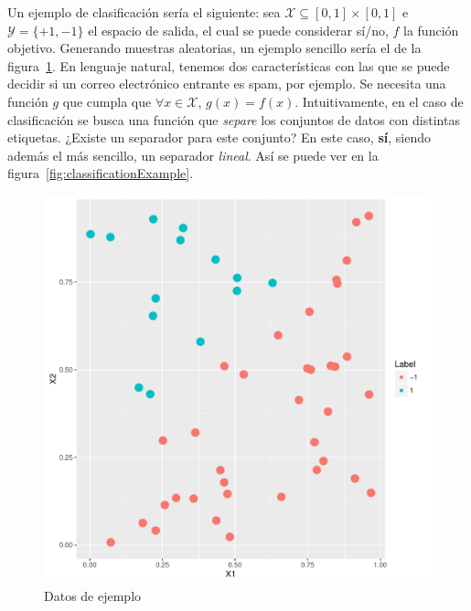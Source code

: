 \documentclass[a4paper,11pt]{book}\usepackage[]{graphicx}\usepackage[]{color}
\makeatletter
\def\maxwidth{ %
  \ifdim\Gin@nat@width>\linewidth
    \linewidth
  \else
    \Gin@nat@width
  \fi
}
\newenvironment{knitrout}{}{} %
\makeatother
\begin{document}
Un ejemplo de clasificación sería el siguiente:
sea $\mathcal{X} \subseteq [0,1] \times [0,1]$ e $\mathcal{Y} = \{+1,-1\}$ el espacio
de salida, el cual se puede considerar sí/no, $f$ la función objetivo.
Generando muestras aleatorias, un ejemplo sencillo sería el de la
figura~\ref{fig:dataExample}. En lenguaje natural, tenemos dos características
con las que se puede decidir si un correo electrónico entrante es spam, por ejemplo.
Se necesita una función $g$ que cumpla que $\forall x \in \mathcal{X}$, $g(x) = f(x)$.
Intuitivamente, en el caso de clasificación se busca una función que \emph{separe}
los conjuntos de datos con distintas etiquetas. ¿Existe un separador para este conjunto?
En este caso, \textbf{sí}, siendo además el más sencillo, un separador \emph{lineal}.
Así se puede ver en la figura~\ref{fig:classificationExample}.





\begin{knitrout}
\color{fgcolor}\begin{figure}
\includegraphics[width=\maxwidth]{figure/dataExample-1} \caption[Datos de ejemplo]{Datos de ejemplo}\label{fig:dataExample}
\end{figure}


\end{knitrout}
\end{document}
